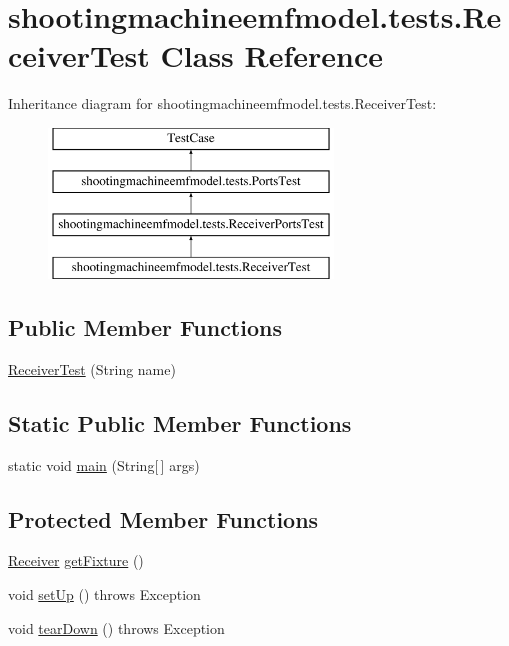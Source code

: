 \hypertarget{classshootingmachineemfmodel_1_1tests_1_1_receiver_test}{\section{shootingmachineemfmodel.\-tests.\-Receiver\-Test Class Reference}
\label{classshootingmachineemfmodel_1_1tests_1_1_receiver_test}
}
Inheritance diagram for shootingmachineemfmodel.\-tests.\-Receiver\-Test\-:\begin{figure}[H]
\begin{center}
\leavevmode
\includegraphics[height=4.000000cm]{classshootingmachineemfmodel_1_1tests_1_1_receiver_test}
\end{center}
\end{figure}
\subsection*{Public Member Functions}
\begin{DoxyCompactItemize}
\item 
\hyperlink{classshootingmachineemfmodel_1_1tests_1_1_receiver_test_af7f581e8d1d39be1e07564e1d51ac353}{Receiver\-Test} (String name)
\end{DoxyCompactItemize}
\subsection*{Static Public Member Functions}
\begin{DoxyCompactItemize}
\item 
static void \hyperlink{classshootingmachineemfmodel_1_1tests_1_1_receiver_test_aa4356df22e49cb03dcca02e37b90321b}{main} (String\mbox{[}$\,$\mbox{]} args)
\end{DoxyCompactItemize}
\subsection*{Protected Member Functions}
\begin{DoxyCompactItemize}
\item 
\hyperlink{interfaceshootingmachineemfmodel_1_1_receiver}{Receiver} \hyperlink{classshootingmachineemfmodel_1_1tests_1_1_receiver_test_a6f74bffdefadc0663d75c3a90848e80a}{get\-Fixture} ()
\item 
void \hyperlink{classshootingmachineemfmodel_1_1tests_1_1_receiver_test_a62640f959676e062c03d4b2d3abd8246}{set\-Up} ()  throws Exception 
\item 
void \hyperlink{classshootingmachineemfmodel_1_1tests_1_1_receiver_test_ab39911a81d50f8ff46a782c9e9d6b0c6}{tear\-Down} ()  throws Exception 
\end{DoxyCompactItemize}
